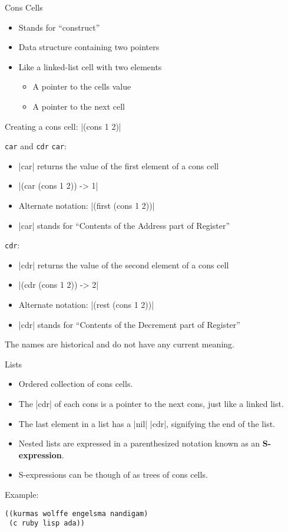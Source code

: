\documentclass{beamer}
\begin{document}

\begin{frame}{Cons Cells}
  \begin{itemize}
  \item Stands for ``construct''
  \item Data structure containing two pointers
  \item Like a linked-list cell with two elements
    \begin{itemize}
    \item A pointer to the cells value
    \item A pointer to the next cell
    \end{itemize}
  \end{itemize}

  Creating a cons cell: \cl|(cons 1 2)|
\end{frame}

\begin{frame}{\texttt{car} and \texttt{cdr}}
  \texttt{car}:
  \begin{itemize}
  \item \cl|car| returns the value of the first element of a cons cell
  \item \cl|(car (cons 1 2)) -> 1|
  \item Alternate notation: \cl|(first (cons 1 2))|
  \item \cl|car| stands for ``Contents of the Address part of Register''
  \end{itemize}
  \texttt{cdr}:
  \begin{itemize}
  \item \cl|cdr| returns the value of the second element of a cons cell
  \item \cl|(cdr (cons 1 2)) -> 2|
  \item Alternate notation: \cl|(rest (cons 1 2))|
  \item \cl|cdr| stands for ``Contents of the Decrement part of Register''
  \end{itemize}
  The names are historical and do not have any current meaning.
\end{frame}

\begin{frame}[fragile]{Lists}
\begin{itemize}
\item Ordered collection of cons cells.
\item The \cl|cdr| of each cons is a pointer to the next cons, just like a linked list.
\item The last element in a list has a \cl|nil| \cl|cdr|, signifying the end of the list.
\item Nested lists are expressed in a parenthesized notation known as an \textbf{S-expression}.
\item S-expressions can be though of as trees of cons cells.
\end{itemize}
Example:
\begin{verbatim}
((kurmas wolffe engelsma nandigam)
 (c ruby lisp ada))
\end{verbatim}
\end{frame}
\end{document}
